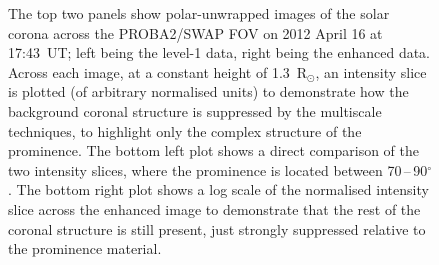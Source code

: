 \documentclass[preprint2]{aastex}
\begin{document}
\begin{figure}[ht]
\caption{The top two panels show polar-unwrapped images of the solar corona across the PROBA2/SWAP FOV on 2012 April 16 at 17:43~UT; left being the level-1 data, right being the enhanced data. Across each image, at a constant height of 1.3~R$_\odot$, an intensity slice is plotted (of arbitrary normalised units) to demonstrate how the background coronal structure is suppressed by the multiscale techniques, to highlight only the complex structure of the prominence. The bottom left plot shows a direct comparison of the two intensity slices, where the prominence is located between 70\,--\,90$^\circ$. The bottom right plot shows a log scale of the normalised intensity slice across the enhanced image to demonstrate that the rest of the coronal structure is still present, just strongly suppressed relative to the prominence material.}
\label{combine_polar_figs}
\end{figure}
\end{document}
